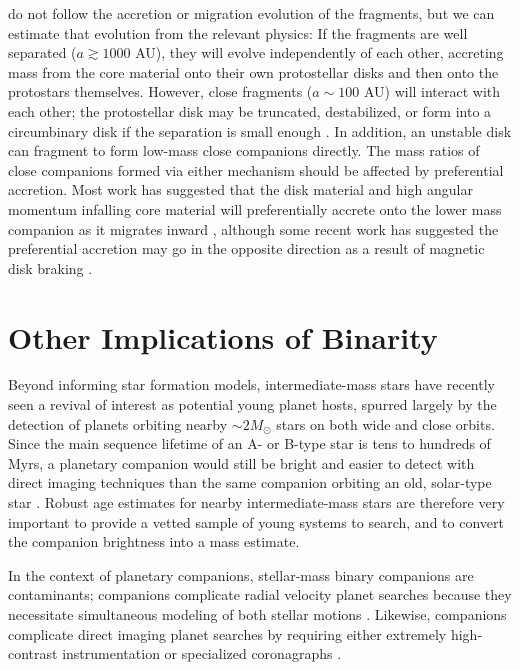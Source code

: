 \documentclass{utthesis}
\begin{document}
\citet{Machida2008} do not follow the accretion or migration evolution of the fragments, but we can estimate that evolution from the relevant physics: If the fragments are well separated ($a \gtrsim 1000$ AU), they will evolve independently of each other, accreting mass from the core material onto their own protostellar disks and then onto the protostars themselves.  However, close fragments ($a \sim 100$ AU) will interact with each other; the protostellar disk may be truncated, destabilized, or form into a circumbinary disk if the separation is small enough \citep{Bate1997}. In addition, an unstable disk can fragment to form low-mass close companions \citep{Kratter2006, Stamatellos2011} directly. The mass ratios of close companions formed via either mechanism should be affected by preferential accretion. Most work has suggested that the disk material and high angular momentum infalling core material will preferentially accrete onto the lower mass companion as it migrates inward \citep{Bate1997, BBB2002}, although some recent work has suggested the preferential accretion may go in the opposite direction as a result of magnetic disk braking \citep{Zhao2013}.




\section{Other Implications of Binarity}

Beyond informing star formation models, intermediate-mass stars have recently seen a revival of interest as potential young planet hosts, spurred largely by the detection of planets orbiting nearby \mbox{$\sim2 M_{\odot}$} stars on both wide \citep[e.g.][]{Lagrange2010, Marois2008} and close \citep{Johnson2011} orbits. Since the main sequence lifetime of an A- or B-type star is tens to hundreds of Myrs, a planetary companion would still be bright and easier to detect with direct imaging techniques than the same companion orbiting an old, solar-type star \citep{Marley2007}. Robust age estimates for nearby intermediate-mass stars are therefore very important to provide a vetted sample of young systems to search, and to convert the companion brightness into a mass estimate. 

In the context of planetary companions, stellar-mass binary companions are contaminants; companions complicate radial velocity planet searches because they necessitate simultaneous modeling of both stellar motions \citep[e.g.][]{Bergmann2015}. Likewise, companions complicate direct imaging planet searches by requiring either extremely high-contrast instrumentation \citep{Thalmann2014} or specialized coronagraphs \citep{Crepp2010}. 
\end{document}
